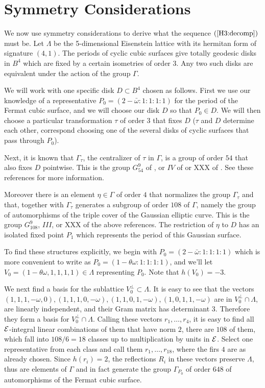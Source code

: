 \section{Symmetry Considerations}

We now use symmetry considerations to derive what the sequence $(\ref{H3:decomp})$ must
be. Let $\Lambda$ be the 5-dimensional Eisenstein lattice with its hermitan form of
signature $(4,1)$. The periods of cyclic cubic surfaces give totally geodesic disks in
$B^4$ which are fixed by a certain isometries of order $3$. Any two such disks are
equivalent under the action of the group $\Gamma$.

We will work with one specific disk $D\subset B^4$ chosen as follows. First we use our
knowledge of a representative $P_0 = (2-\bar\omega:1:1:1:1)$ for the period of the
Fermat cubic surface, and we will choose our disk $D$ so that $P_0\in D$. We will then
choose a particular transformation $\tau$ of order $3$ that fixes $D$ ($\tau$ and $D$
determine each other, correspond choosing one of the several disks of cyclic surfaces
that pass through $P_0$).

Next, it is known that $\Gamma_\tau$, the centralizer of $\tau$ in $\Gamma$, is a group
of order $54$ that also fixes $D$ pointwise. This is the group $G_{54}^9$ of
\cite{Hosoh}, or $IV$ of \cite{Dolgachev} or XXX of \cite{Segre}. See these references
for more information.

 Moreover there is an element $\eta\in\Gamma$ of order $4$ that normalizes the group
$\Gamma_\tau$ and that, together with $\Gamma_\tau$ generates a subgroup of order $108$
of $\Gamma$, namely the group of automorphisms of the triple cover of the Gaussian
elliptic curve. This is the group $G_{108}^9$, $III$, or XXX of the above references.
The restriction of $\eta$ to $D$ has an isolated fixed point $P_1$ which represents the
period of this Gaussian surface.

 To find these structures explicitly, we begin with $P_0 = (2 - \bar\omega :1:1:1:1)$
which is more convenient to write as $P_0 = (1- \theta\omega :1:1:1:1)$, and we'll let
$V_0 = (1-\theta\omega,1,1,1,1)\in\Lambda$ representing $P_0$. Note that $h(V_0) = -3$.


 We next find a basis for the sublattice $V_0^\bot \subset\Lambda$. It is easy to see
that the vectors $(1,1,1,-\omega,0), (1,1,1,0,-\omega), (1,1,0,1,-\omega),
(1,0,1,1,-\omega)$ are in $V_0^\bot\cap\Lambda$, are linearly independent, and their
Gram matrix has determinant $3$. Therefore they form a basis for $V_0^\bot\cap\Lambda$.
Calling these vectors $r_1,\dots,r_4$, it is easy to find all ${ \mathcal E }$-integral linear
combinations of them that have norm $2$, there are $108$ of them, which fall into
$108/6 = 18$ classes up to multiplication by units in ${ \mathcal E }$. Select one representative
from each class and call them $r_1,\dots,r_{18}$, where the firs $4$ are as already
chosen. Since $h(r_i) = 2$, the reflections $R_i$ in these vectors preserve $\Lambda$,
thus are elements of $\Gamma$ and in fact generate the group $\Gamma_{P_0}$ of order
$648$ of automorphisms of the Fermat cubic surface.



